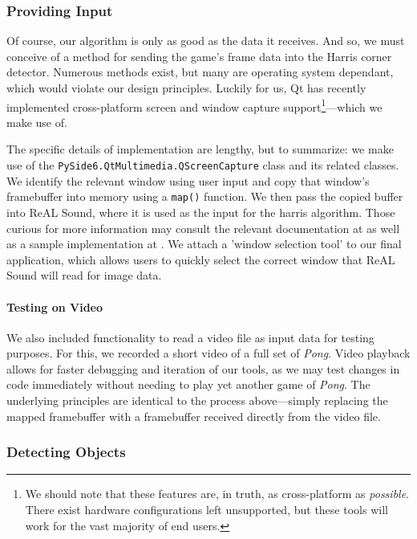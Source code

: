 \documentclass{report}
\newcommand{\rs}{ReAL Sound\xspace}
\begin{document}
\subsubsection{Providing Input}
Of course, our algorithm is only as good as the data it receives. And so, we must conceive of a method for sending the game's frame data into the Harris corner detector. Numerous methods exist, but many are operating system dependant, which would violate our design principles. Luckily for us, Qt has recently implemented cross-platform screen and window capture support\footnote{We should note that these features are, in truth, as cross-platform as \emph{possible}. There exist hardware configurations left unsupported, but these tools will work for the vast majority of end users.}---which we make use of.
 
The specific details of implementation are lengthy, but to summarize: we make use of the \texttt{PySide6.QtMultimedia.QScreenCapture} class and its related classes. We identify the relevant window using user input and copy that window's framebuffer into memory using a \texttt{map()} function. We then pass the copied buffer into \rs, where it is used as the input for the harris algorithm.  Those curious for more information may consult the relevant documentation at \cite{QT_Doc} as well as a sample implementation at \cite{QT_EX}. We attach a 'window selection tool' to our final application, which allows users to quickly select the correct window that \rs will read for image data. 

\paragraph{Testing on Video} 
We also included functionality to read a video file as input data for testing purposes. For this, we recorded a short video of a full set of \emph{Pong}. Video playback allows for faster debugging and iteration of our tools, as we may test changes in code immediately without needing to play yet another game of \emph{Pong}. The underlying principles are identical to the process above---simply replacing the mapped framebuffer with a framebuffer received directly from the video file.

\subsubsection{Detecting Objects}
\end{document}
